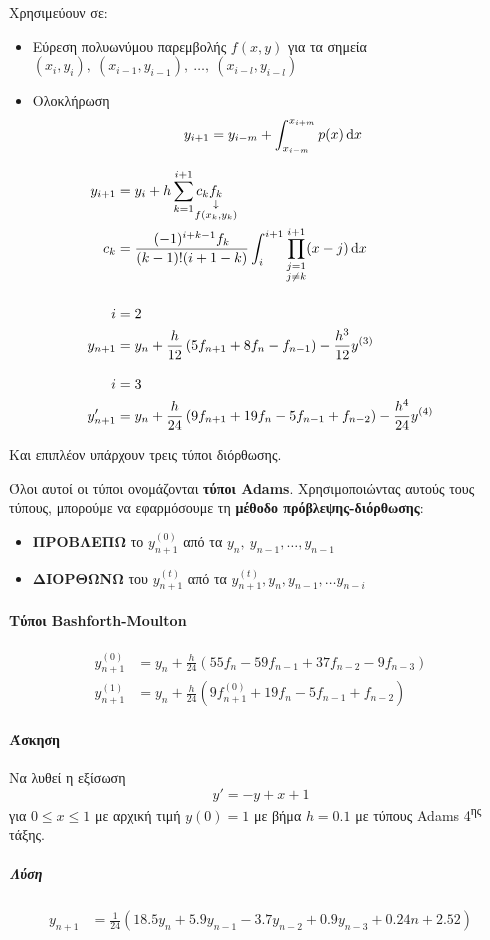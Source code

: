 \documentclass[11pt,a4paper,notitlepage,fleqn]{article}
\begin{document}
Χρησιμεύουν σε:
\begin{itemize}
	\item Εύρεση πολυωνύμου παρεμβολής \( 
	f(x,y)
	 \) για τα σημεία \( (x_i,y_i),\ (x_{i-1},y_{i-1}),\ \dots,\
	 (x_{i-l},y_{i-l})
	  \)
	\item Ολοκλήρωση
	\[
	y_{i+1} = y_{i-m} + \int_{x_{i-m}}^{x_{i+m}} p(x)\mathop{}\!\mathrm{d} x
	\]
\end{itemize}

\begin{align*}
	y_{i+1} &= y_i +h\sum_{k=1}^{i+1} c_k
	\underset{\substack{\downarrow\\ \mathclap{f(x_k,y_k)}}}{f_k} \\
	c_k &= \frac{(-1)^{i+k-1}f_k}{(k-1)!(i+1-k)}
	\int_{i}^{i+1} \prod_{\substack{j=1\\j\neq k}}^{i+1}
	(x-j)\dif x \\[3ex]
	i &= 2\\
	y_{n+1} &=
	y_n + \frac{h}{12}\left(5f_{n+1}+8f_n-f_{n-1}\right)
	-\frac{h^3}{12}y^{(3)} \\[2ex]
	i &= 3\\
	y_{n+1}' &= y_n+\frac{h}{24}\left(
	9f_{n+1}+19f_n-5f_{n-1}+f_{n-2}
	\right) -\frac{h^4}{24}y^{(4)}
\end{align*}

Και επιπλέον υπάρχουν τρεις τύποι διόρθωσης.

Όλοι αυτοί οι τύποι ονομάζονται \textbf{τύποι Adams}. Χρησιμοποιώντας
αυτούς τους τύπους, μπορούμε να εφαρμόσουμε τη \textbf{μέθοδο
πρόβλεψης-διόρθωσης}:
\begin{itemize}
	\item \textbf{ΠΡΟΒΛΕΠΩ}
	το \( y_{n+1}^{(0)} \) από τα \( y_n,\ y_{n-1},\dots,
	y_{n-1} \)
	\item \textbf{ΔΙΟΡΘΩΝΩ}
	του \( y_{n+1}^{(t)} \) από τα \( y_{n+1}^{(t)}, y_n,y_{n-1},\dots
	y_{n-i} \)
\end{itemize}

\paragraph{Τύποι Bashforth-Moulton}
\begin{align*}
	y_{n+1}^{(0)} &= y_n+\frac{h}{24} \left(
	55f_n-59f_{n-1}+37f_{n-2}-9f_{n-3}
	\right) \\
	y_{n+1}^{(1)} &= y_n + \frac{h}{24} \left(
	9f_{n+1}^{(0)}+19f_n-5f_{n-1}+f_{n-2}
	\right)
\end{align*}

\paragraph{Άσκηση}
Να λυθεί η εξίσωση
\[
y' = -y+x+1
\] για \( 0\leq x \leq 1 \) με αρχική τιμή \( y(0)=1 \) με βήμα
\( h=0.1 \) με τύπους Adams 4\textsuperscript{ης} τάξης.
\subparagraph{Λύση}
\begin{align*}
	y_{n+1} &= \frac{1}{24} (18.5y_n
	+5.9y_{n-1}-3.7y_{n-2}+0.9y_{n-3}+0.24n+2.52)
\end{align*}
\end{document}
